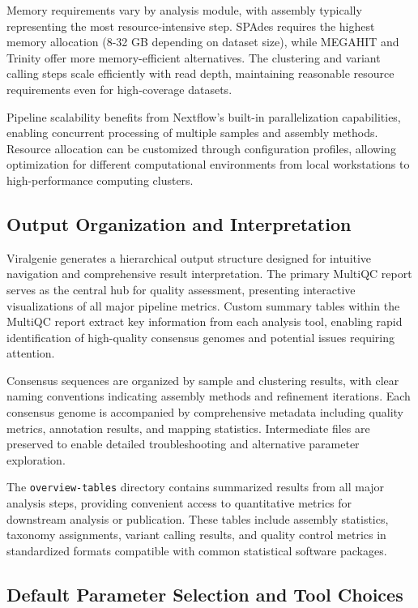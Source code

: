 \documentclass[unnumsec,webpdf,contemporary,large]{oup-authoring-template}%
\theoremstyle{thmstyleone}%
\theoremstyle{thmstyletwo}%
\theoremstyle{thmstylethree}%
\begin{document}
Memory requirements vary by analysis module, with assembly typically representing the most resource-intensive step. SPAdes requires the highest memory allocation (8-32 GB depending on dataset size), while MEGAHIT and Trinity offer more memory-efficient alternatives. The clustering and variant calling steps scale efficiently with read depth, maintaining reasonable resource requirements even for high-coverage datasets.

Pipeline scalability benefits from Nextflow's built-in parallelization capabilities, enabling concurrent processing of multiple samples and assembly methods. Resource allocation can be customized through configuration profiles, allowing optimization for different computational environments from local workstations to high-performance computing clusters.

\subsection{Output Organization and Interpretation}\label{subsec_output}

Viralgenie generates a hierarchical output structure designed for intuitive navigation and comprehensive result interpretation. The primary MultiQC report serves as the central hub for quality assessment, presenting interactive visualizations of all major pipeline metrics. Custom summary tables within the MultiQC report extract key information from each analysis tool, enabling rapid identification of high-quality consensus genomes and potential issues requiring attention.

Consensus sequences are organized by sample and clustering results, with clear naming conventions indicating assembly methods and refinement iterations. Each consensus genome is accompanied by comprehensive metadata including quality metrics, annotation results, and mapping statistics. Intermediate files are preserved to enable detailed troubleshooting and alternative parameter exploration.

The \texttt{overview-tables} directory contains summarized results from all major analysis steps, providing convenient access to quantitative metrics for downstream analysis or publication. These tables include assembly statistics, taxonomy assignments, variant calling results, and quality control metrics in standardized formats compatible with common statistical software packages.

\subsection{Default Parameter Selection and Tool Choices}\label{subsec_parameters}
\end{document}
